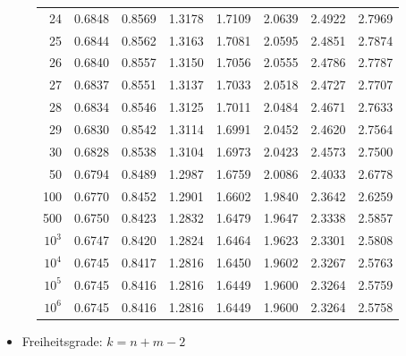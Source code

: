 \begin{figure}[h!]
\begin{center}
\begin{tabular}{|r|rrrrrrr|}
24&0.6848&0.8569&1.3178&1.7109&2.0639&2.4922&2.7969\\
25&0.6844&0.8562&1.3163&1.7081&2.0595&2.4851&2.7874\\
26&0.6840&0.8557&1.3150&1.7056&2.0555&2.4786&2.7787\\
27&0.6837&0.8551&1.3137&1.7033&2.0518&2.4727&2.7707\\
28&0.6834&0.8546&1.3125&1.7011&2.0484&2.4671&2.7633\\
29&0.6830&0.8542&1.3114&1.6991&2.0452&2.4620&2.7564\\
30&0.6828&0.8538&1.3104&1.6973&2.0423&2.4573&2.7500\\
50&0.6794&0.8489&1.2987&1.6759&2.0086&2.4033&2.6778\\
100&0.6770&0.8452&1.2901&1.6602&1.9840&2.3642&2.6259\\
500&0.6750&0.8423&1.2832&1.6479&1.9647&2.3338&2.5857\\
$10^3$&0.6747&0.8420&1.2824&1.6464&1.9623&2.3301&2.5808\\
$10^4$&0.6745&0.8417&1.2816&1.6450&1.9602&2.3267&2.5763\\
$10^5$&0.6745&0.8416&1.2816&1.6449&1.9600&2.3264&2.5759\\
$10^6$&0.6745&0.8416&1.2816&1.6449&1.9600&2.3264&2.5758\\
\hline
\end{tabular}
\end{center}
\end{figure}

\begin{itemize}
  \item Freiheitsgrade: $k = n + m - 2$
\end{itemize}
